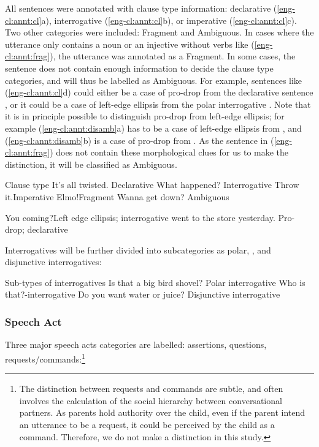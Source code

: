 All sentences were annotated with clause type information: declarative (\ref{eng-cl:annt:cl}a), interrogative (\ref{eng-cl:annt:cl}b), or imperative (\ref{eng-cl:annt:cl}c). Two other categories were included: Fragment and Ambiguous. In cases where the utterance only contains a noun or an injective without verbs like (\ref{eng-cl:annt:frag}), the utterance was annotated as a Fragment. In some cases, the sentence does not contain enough information to decide the clause type categories, and will thus be labelled as Ambiguous. For example, sentences like (\ref{eng-cl:annt:cl}d) could either be a case of pro-drop from the declarative sentence , or it could be a case of left-edge ellipsis from the polar interrogative . Note that it is in principle possible to distinguish pro-drop from left-edge ellipsis; for example (\ref{eng-cl:annt:disamb}a) has to be a case of left-edge ellipsis from , and (\ref{eng-cl:annt:disamb}b) is a case of pro-drop from . As the sentence in (\ref{eng-cl:annt:frag}) does not contain these morphological clues for us to make the distinction, it will be classified as Ambiguous.

Clause type
\bxl
\label{eng-cl:annt:decl}
It’s all twisted. \hfill Declarative
\ex \label{eng-cl:annt:int} What happened?	\hfill Interrogative
\ex \label{eng-cl:annt:imp} Throw it.\hfill Imperative
\ex \label{eng-cl:annt:frag}	Elmo!\hfill	Fragment
\ex \label{eng-cl:annt:amb} Wanna get down?	\hfill Ambiguous
\exl
\eex

\bxl{} You coming?\hfill Left edge ellipsis; interrogative
\ex went to the store yesterday. \hfill	Pro-drop; declarative
\exl
\eex

Interrogatives will be further divided into subcategories as polar, \twh, and disjunctive interrogatives:

	Sub-types of interrogatives
\bxl{}
Is that a big bird shovel? \hfill	Polar interrogative
\ex	Who is that?\hfill	\twh-interrogative
\ex	Do you want water or juice? \hfill Disjunctive interrogative
\exl
\eex

\subsubsection{Speech Act}

Three major speech acts categories are labelled: assertions, questions, requests/commands:\footnote{The distinction between requests and commands are subtle, and often involves the calculation of the social hierarchy between conversational partners. As parents hold authority over the child, even if the parent intend an utterance to be a request, it could be perceived by the child as a command. Therefore, we do not make a distinction in this study.}

